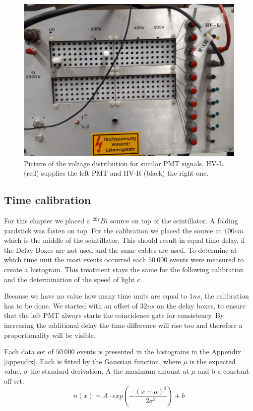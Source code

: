 \documentclass[]{article}
\begin{document}
\begin{figure}[H]
\centering
\includegraphics[width=1\textwidth]{Plots/Spannung.jpg}
\caption{Picture of the voltage distribution for similar PMT signals. HV-L (red) supplies the left PMT and HV-R (black) the right one.}
\label{fig:voltage}
\end{figure}


\subsection{Time calibration}\label{time}
For this chapter we placed a $^{207}Bi$ source on top of the scintillator. A folding yardstick was fasten on top. For the calibration we placed the source at $100cm$ which is the middle of the scintillator. This should result in equal time delay, if the Delay Boxes are not used and the same cables are used. To determine at which time unit the most events occurred each $50\ 000$ events were measured to create a histogram. This treatment stays the same for the following calibration and the determination of the speed of light c.

Because we have no value how many time units are equal to $1ns$, the calibration has to be done. We started with an offset of $32ns$ on the delay boxes, to ensure that the left PMT always starts the coincidence gate for consistency. By increasing the additional delay the time difference will rise too and therefore a proportionality will be visible.

Each data set of $50\ 000$ events is presented in the histograms in the Appendix \ref{appendix}. Each is fitted by the Gaussian function, where $\mu$ is the expected value, $\sigma$ the standard derivation, A the maximum amount at $\mu$ and b a constant off-set.
\begin{equation}
n(x) = A\cdot exp \left( -\frac{(x-\mu)^2}{2\sigma^2} \right) + b
\end{equation}
\end{document}
